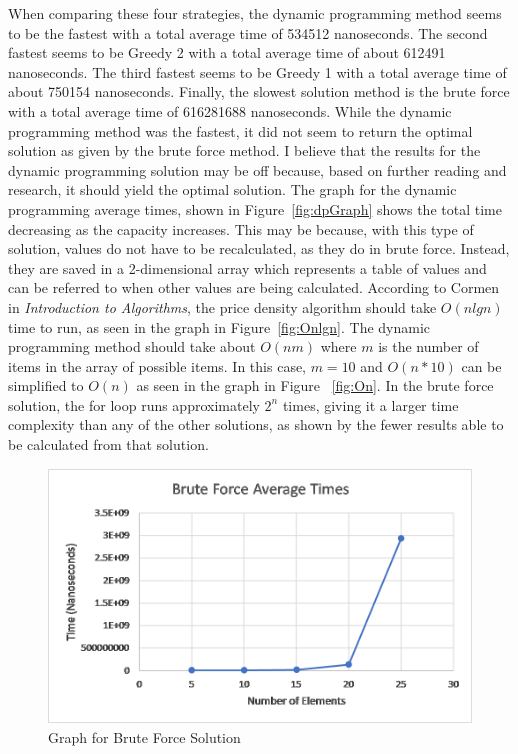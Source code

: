 \documentclass[onecolumn, letterpaper, 12pt]{article}
\begin{document}
When comparing these four strategies, the dynamic programming method seems to be the fastest with a total average time of 534512 nanoseconds. The second fastest seems to be Greedy 2 with a total average time of about 612491 nanoseconds. The third fastest seems to be Greedy 1 with a total average time of about 750154 nanoseconds. Finally, the slowest solution method is the brute force with a total average time of 616281688 nanoseconds. While the dynamic programming method was the fastest, it did not seem to return the optimal solution as given by the brute force method. I believe that the results for the dynamic programming solution may be off because, based on further reading and research, it should yield the optimal solution. The graph for the dynamic programming average times, shown in Figure~\ref{fig:dpGraph} shows the total time decreasing as the capacity increases. This may be because, with this type of solution, values do not have to be recalculated, as they do in brute force. Instead, they are saved in a 2-dimensional array which represents a table of values and can be referred to when other values are being calculated. According to Cormen in \textit{Introduction to Algorithms}, the price density algorithm should take $O(nlgn)$ time to run, as seen in the graph in Figure~\ref{fig:Onlgn}. The dynamic programming method should take about $O(nm)$ where $m$ is the number of items in the array of possible items. In this case, $m = 10$ and $O(n*10)$ can be simplified to $O(n)$ as seen in the graph in Figure ~\ref{fig:On}. In the brute force solution, the for loop runs approximately $2^n$ times, giving it a larger time complexity than any of the other solutions, as shown by the fewer results able to be calculated from that solution. 

\begin{figure}[H]
\centering
\includegraphics[width=0.8\linewidth]{./bruteForce.png}
\caption{Graph for Brute Force Solution}
\label{fig:bruteForceGraph}
\end{figure}
\end{document}
